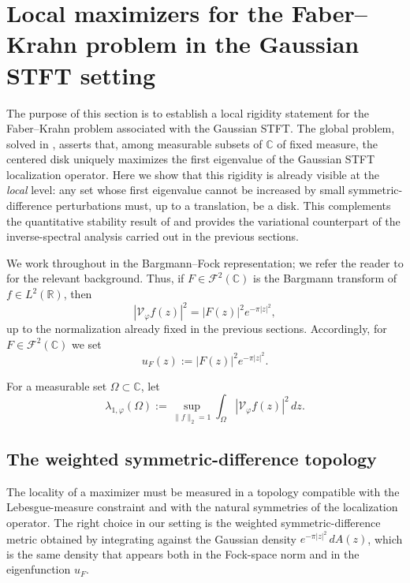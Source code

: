 \documentclass[a4paper,11pt,reqno]{amsart}
\numberwithin{equation}{section}
\theoremstyle{plain} %
\theoremstyle{definition} %
\theoremstyle{remark}
\newcommand{\R}{\mathbb{R}}
\newcommand{\C}{\mathbb{C}}
\begin{document}
\section{Local maximizers for the Faber--Krahn problem in the Gaussian STFT setting}

The purpose of this section is to establish a local rigidity statement for the
Faber--Krahn problem associated with the Gaussian STFT. The global problem,
solved in \cite{Nicola-Tilli}, asserts that, among measurable subsets of \(\C\)
of fixed measure, the centered disk uniquely maximizes the first eigenvalue of
the Gaussian STFT localization operator. Here we show that this rigidity is
already visible at the \emph{local} level: any set whose first eigenvalue cannot
be increased by small symmetric-difference perturbations must, up to a
translation, be a disk. This complements the quantitative stability result of
\cite{Gomez-Guerra-Ramos-Tilli} and provides the variational counterpart of the
inverse-spectral analysis carried out in the previous sections.

We work throughout in the Bargmann--Fock representation; we refer the reader to
\cite{Bargmann,Folland,Grochenig} for the relevant background. Thus, if
\(F\in \mathcal F^2(\C)\) is the Bargmann transform of \(f\in L^2(\R)\), then
\[
|\mathcal V_\varphi f(z)|^2 = |F(z)|^2 e^{-\pi |z|^2},
\]
up to the normalization already fixed in the previous sections. Accordingly, for
\(F\in \mathcal F^2(\C)\) we set
\[
u_F(z):=|F(z)|^2 e^{-\pi |z|^2}.
\]

For a measurable set \(\Omega\subset \C\), let
\begin{equation}\label{eq:lambda1-def-sec6}
\lambda_{1,\varphi}(\Omega)
:=
\sup_{\|f\|_2=1}\int_\Omega |\mathcal V_\varphi f(z)|^2\,dz.
\end{equation}

\subsection{The weighted symmetric-difference topology}

The locality of a maximizer must be measured in a topology compatible with the
Lebesgue-measure constraint and with the natural symmetries of the localization
operator. The right choice in our setting is the weighted symmetric-difference
metric obtained by integrating against the Gaussian density
\(e^{-\pi|z|^2}\,dA(z)\), which is the same density that appears both in the
Fock-space norm and in the eigenfunction \(u_F\).
\end{document}
